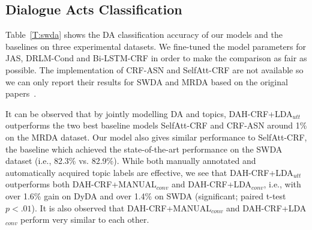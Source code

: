 \documentclass[11pt,a4paper]{article}
\begin{document}
\begin{table}[tb] 
  \caption{DA classification accuracy.  
  $^\dag$ indicates the results which are reported from the prior publications.}
  \label{T:swda}
\end{table}


\subsection{Dialogue Acts Classification}
Table~\ref{T:swda} shows the DA classification accuracy of our models and the baselines on three experimental datasets. We fine-tuned the model parameters for JAS, DRLM-Cond and Bi-LSTM-CRF in order to make the comparison as fair as possible. The implementation of CRF-ASN and SelfAtt-CRF are not available so we can only report their results for SWDA and MRDA based on the original papers~\cite{chen2018dialogue,raheja2019dialogue}. 


It can be observed that by jointly modelling DA and topics,
DAH-CRF+LDA$_{utt}$ outperforms the two best baseline models  SelfAtt-CRF and CRF-ASN  around 1\% on the MRDA dataset.
Our model also gives similar performance to SelfAtt-CRF, the baseline which achieved the state-of-the-art performance on the SWDA dataset (i.e., 82.3\% vs. 82.9\%). 
While both manually annotated and automatically acquired topic labels are effective, we see that DAH-CRF+LDA$_{utt}$  outperforms both  DAH-CRF+MANUAL$_{conv}$ and DAH-CRF+LDA$_{conv}$, i.e., with over 1.6\% gain on  DyDA and over 1.4\% on SWDA  (significant; paired t-test $p<.01$). It is also observed that DAH-CRF+MANUAL$_{conv}$ and DAH-CRF+LDA$_{conv}$ perform very similar to each other. 
\end{document}
